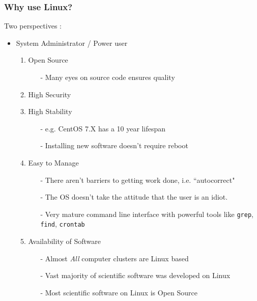 \documentclass{beamer}
\newcommand{\code}[1]{\colorbox{codegray}{\texttt{#1}}}
\begin{document}
\begin{frame}
\frametitle{Why use Linux?}
Two perspectives : 
\begin{itemize}
    \item System Administrator / Power user
    \pause
    \begin{enumerate}
        \item Open Source 
        \begin{itemize}
            \item[-] Many eyes on source code ensures quality
        \end{itemize}
        \pause
        \item High Security 
        \pause
        \item High Stability
        \begin{itemize}
            \pause
            \item[-] e.g. CentOS 7.X has a 10 year lifespan
            \pause
            \item[-] Installing new software doesn't require reboot
        \end{itemize}
        \pause
        \item Easy to Manage
        \begin{itemize}
            \pause
            \item[-] There aren't barriers to getting work done, i.e. ``autocorrect"
            \pause
            \item[-] The OS doesn't take the attitude that the user is an idiot.
            \pause
            \item[-] Very mature command line interface with powerful tools like \code{grep}, \code{find}, \code{crontab}
        \end{itemize}
        \pause
        \item Availability of Software
        \pause
        \begin{itemize}
            \item[-] Almost \emph{All} computer clusters are Linux based
            \pause
            \item[-] Vast majority of scientific software was developed on Linux 
            \pause
            \item[-] Most scientific software on Linux is Open Source 
        \end{itemize}
    \end{enumerate}
\end{itemize}
\end{frame}
\end{document}
